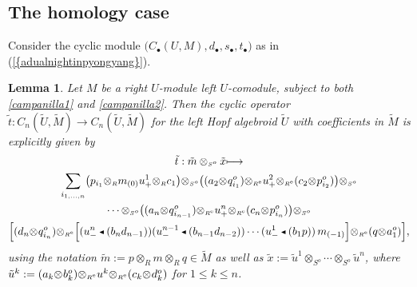 \documentclass[reqno, a4paper, 10pt]{amsart}
\numberwithin{equation}{section}
\theoremstyle{plain}
\newtheorem{lemma}[theorem]{Lemma}
\theoremstyle{definition}
\theoremstyle{remark}
\begin{document}
\subsection{The homology case}
Consider the cyclic module $\big(C_{{\scriptscriptstyle{\bullet}}}(U,M), d_{{\scriptscriptstyle{\bullet}}}, s_{{\scriptscriptstyle{\bullet}}}, t_{{\scriptscriptstyle{\bullet}}}\big)$ as in {{\rm (}\ref{{adualnightinpyongyang}}{\rm )}}.

\begin{lemma}
\label{Lemma:II}
Let  $M$ be a right $U$-module left
 $U$-comodule, subject to both \eqref{campanilla1} and \eqref{campanilla2}. 
Then the cyclic operator $\tilde{t}: C_n(\tilde{U}, \tilde{M}) \to C_n(\tilde{U}, \tilde{M})$ 
for the left Hopf algebroid $\tilde{U}$ with coefficients in ${\tilde{{M}}}$ is explicitly given by
\begin{multline*}
\tilde{t}: \tilde{m} \otimes_{{\scriptscriptstyle{{S^{o}}}}} \tilde{x} { \longmapsto  } \\ 
 \underset{i_{1,\ldots,n}}{\sum}{\big( {p_{i_1}{\otimes_{\scriptscriptstyle{{R}}}}m_{(0)}u^1_{+}{\otimes_{\scriptscriptstyle{{R}}}}c_1} \big)}{\otimes_{\scriptscriptstyle{{S^{{{o}}}}}}}
{\big( {(a_2{\otimes_{\scriptscriptstyle{{}}}}q_{i_1}^o){\otimes_{\scriptscriptstyle{{\scriptscriptstyle{{R^{\rm e}}}}}}}u^2_{+}{\otimes_{\scriptscriptstyle{{\scriptscriptstyle{{R^{\rm e}}}}}}} (c_2{\otimes_{\scriptscriptstyle{{}}}}p_{i_2}^o)} \big)}{\otimes_{\scriptscriptstyle{{S^{{{o}}}}}}}  \\ \cdots{\otimes_{\scriptscriptstyle{{S^{{{o}}}}}}} {\big( {(a_n{\otimes_{\scriptscriptstyle{{}}}}q_{i_{n-1}}^o){\otimes_{\scriptscriptstyle{{\scriptscriptstyle{{R^{\rm e}}}}}}}u^n_{+}{\otimes_{\scriptscriptstyle{{\scriptscriptstyle{{R^{\rm e}}}}}}}(c_n{\otimes_{\scriptscriptstyle{{}}}}p_{i_n}^o)} \big)} {\otimes_{\scriptscriptstyle{{S^{{{o}}}}}}}  \\ {\left[\underset{}{} {(d_n{\otimes_{\scriptscriptstyle{{}}}}q_{i_n}^o) {\otimes_{\scriptscriptstyle{{\scriptscriptstyle{{R^{\rm e}}}}}}}{\left[\underset{}{} {(u^n_-{{\,\raise1pt\hbox{$\scriptscriptstyle{\blacktriangleleft}$} \, }} (b_nd_{n-1}))(u^{n-1}_-{{\,\raise1pt\hbox{$\scriptscriptstyle{\blacktriangleleft}$} \, }} (b_{n-1}d_{n-2}))\cdots (u^1_{-}{{\,\raise1pt\hbox{$\scriptscriptstyle{\blacktriangleleft}$} \, }} (b_1p)) \, m_{(-1)}} \right]}{\otimes_{\scriptscriptstyle{{\scriptscriptstyle{{R^{\rm e}}}}}}}(q{\otimes_{\scriptscriptstyle{{}}}}a_1^o)} \right]},
\end{multline*}
using the notation ${\tilde{{m}}} := p{\otimes_{\scriptscriptstyle{{R}}}}m {\otimes_{\scriptscriptstyle{{R}}}}q \in {\tilde{{M}}}$ as well as 
${\tilde{{x}}}:= {\tilde{{u}}}^1{\otimes_{\scriptscriptstyle{{S^{{{o}}}}}}}\cdots{\otimes_{\scriptscriptstyle{{S^{{{o}}}}}}}{\tilde{{u}}}^{n}$, where ${\tilde{{u}}}^{k} := (a_k{\otimes_{\scriptscriptstyle{{}}}}b_k^o){\otimes_{\scriptscriptstyle{{\scriptscriptstyle{{R^{\rm e}}}}}}}u^k{\otimes_{\scriptscriptstyle{{\scriptscriptstyle{{R^{\rm e}}}}}}}(c_k{\otimes_{\scriptscriptstyle{{}}}}d_k^o)$ for $1 \leq k \leq n$.
\end{lemma}
\end{document}
